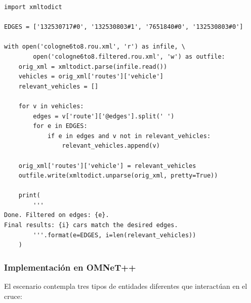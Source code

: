 \documentclass[11pt,letterpaper]{article}
\begin{document}
\noindent\begin{minipage}{\linewidth}
\begin{lstlisting}[style=mPython, caption={Código de extracción de vehículos relevantes.}, label={sumo:py_filter}]
import xmltodict

EDGES = ['132530717#0', '132530803#1', '7651840#0', '132530803#0']

with open('cologne6to8.rou.xml', 'r') as infile, \
        open('cologne6to8.filtered.rou.xml', 'w') as outfile:
    orig_xml = xmltodict.parse(infile.read())
    vehicles = orig_xml['routes']['vehicle']
    relevant_vehicles = []

    for v in vehicles:
        edges = v['route']['@edges'].split(' ')
        for e in EDGES:
            if e in edges and v not in relevant_vehicles:
                relevant_vehicles.append(v)

    orig_xml['routes']['vehicle'] = relevant_vehicles
    outfile.write(xmltodict.unparse(orig_xml, pretty=True))

    print(
        '''
Done. Filtered on edges: {e}.
Final results: {i} cars match the desired edges.
        '''.format(e=EDGES, i=len(relevant_vehicles))
    )
\end{lstlisting}
\end{minipage}

\subsubsection{Implementación en OMNeT++}

El escenario contempla tres tipos de entidades diferentes que interactúan en el cruce:
\end{document}
